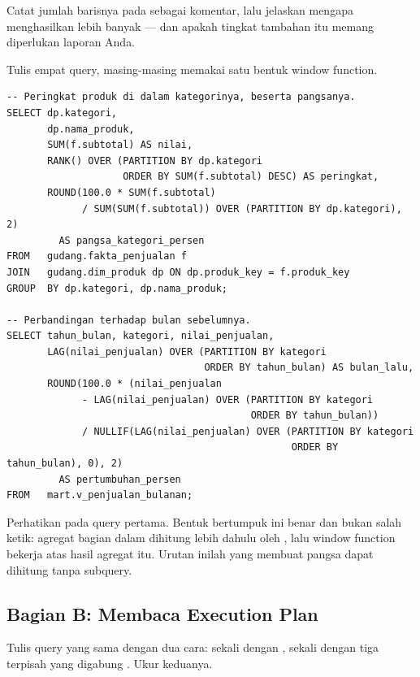 Catat jumlah barisnya pada  sebagai komentar, lalu
jelaskan mengapa  menghasilkan lebih banyak --- dan apakah
tingkat tambahan itu memang diperlukan laporan Anda.


Tulis empat query, masing-masing memakai satu bentuk window function.

\begin{lstlisting}[style=sqlgaya]
-- Peringkat produk di dalam kategorinya, beserta pangsanya.
SELECT dp.kategori,
       dp.nama_produk,
       SUM(f.subtotal) AS nilai,
       RANK() OVER (PARTITION BY dp.kategori
                    ORDER BY SUM(f.subtotal) DESC) AS peringkat,
       ROUND(100.0 * SUM(f.subtotal)
             / SUM(SUM(f.subtotal)) OVER (PARTITION BY dp.kategori), 2)
         AS pangsa_kategori_persen
FROM   gudang.fakta_penjualan f
JOIN   gudang.dim_produk dp ON dp.produk_key = f.produk_key
GROUP  BY dp.kategori, dp.nama_produk;

-- Perbandingan terhadap bulan sebelumnya.
SELECT tahun_bulan, kategori, nilai_penjualan,
       LAG(nilai_penjualan) OVER (PARTITION BY kategori
                                  ORDER BY tahun_bulan) AS bulan_lalu,
       ROUND(100.0 * (nilai_penjualan
             - LAG(nilai_penjualan) OVER (PARTITION BY kategori
                                          ORDER BY tahun_bulan))
             / NULLIF(LAG(nilai_penjualan) OVER (PARTITION BY kategori
                                                 ORDER BY tahun_bulan), 0), 2)
         AS pertumbuhan_persen
FROM   mart.v_penjualan_bulanan;
\end{lstlisting}

\begin{catatan}
Perhatikan  pada query pertama. Bentuk
bertumpuk ini benar dan bukan salah ketik: agregat bagian dalam dihitung lebih
dahulu oleh , lalu window function bekerja atas hasil
agregat itu. Urutan inilah yang membuat pangsa dapat dihitung tanpa subquery.
\end{catatan}

\subsection{Bagian B: Membaca Execution Plan}


Tulis query yang sama dengan dua cara: sekali dengan ,
sekali dengan tiga  terpisah yang digabung
. Ukur keduanya.


